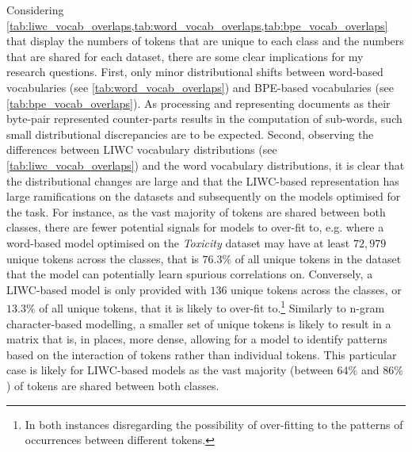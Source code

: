 \begin{table}[h]
\centering
{}
\caption{Number of unique BPE tokens in each class for each dataset and the size of their intersection.}
\label{tab:bpe_vocab_overlaps}
\end{table}

Considering \cref{tab:liwc_vocab_overlaps,tab:word_vocab_overlaps,tab:bpe_vocab_overlaps} that display the numbers of tokens that are unique to each class and the numbers that are shared for each dataset, there are some clear implications for my research questions.
First, only minor distributional shifts between word-based vocabularies (see \cref{tab:word_vocab_overlaps}) and BPE-based vocabularies (see \cref{tab:bpe_vocab_overlaps}).
As processing and representing documents as their byte-pair represented counter-parts results in the computation of sub-words, such small distributional discrepancies are to be expected.
Second, observing the differences between LIWC vocabulary distributions (see \cref{tab:liwc_vocab_overlaps}) and the word vocabulary distributions, it is clear that the distributional changes are large and that the LIWC-based representation has large ramifications on the datasets and subsequently on the models optimised for the task.
For instance, as the vast majority of tokens are shared between both classes, there are fewer potential signals for models to over-fit to, e.g. where a word-based model optimised on the \textit{Toxicity} dataset may have at least $72,979$ unique tokens across the classes, that is $76.3\%$ of all unique tokens in the dataset that the model can potentially learn spurious correlations on.
Conversely, a LIWC-based model is only provided with $136$ unique tokens across the classes, or $13.3\%$ of all unique tokens, that it is likely to over-fit to.\footnote{In both instances disregarding the possibility of over-fitting to the patterns of occurrences between different tokens.}
Similarly to n-gram character-based modelling, a smaller set of unique tokens is likely to result in a matrix that is, in places, more dense, allowing for a model to identify patterns based on the interaction of tokens rather than individual tokens.
This particular case is likely for LIWC-based models as the vast majority (between $64\%$ and $86\%$) of tokens are shared between both classes.


